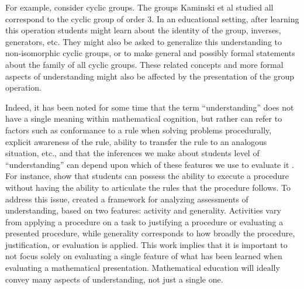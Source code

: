 \documentclass[man,10pt]{apa6}
\begin{document}
For example, consider cyclic groups. The groups Kaminski et al studied all correspond to the cyclic group of order 3. In an educational setting, after learning this operation students might learn about the identity of the group, inverses, generators, etc. They might also be asked to generalize this understanding to non-isomorphic cyclic groups, or to make general and possibly formal statements about the family of all cyclic groups. These related concepts and more formal aspects of understanding might also be affected by the presentation of the group operation. \par
Indeed, it has been noted for some time that the term ``understanding'' does not have a single meaning within mathematical cognition, but rather can refer to factors such as conformance to a rule when solving problems procedurally, explicit awareness of the rule, ability to transfer the rule to an analogous situation, etc., and that the inferences we make about students level of ``understanding'' can depend upon which of these features we use to evaluate it \cite{Bisanz1992}. For instance,  show that students can possess the ability to execute a procedure without having the ability to articulate the rules that the procedure follows. To address this issue,  created a framework for analyzing assessments of understanding, based on two features: activity and generality. Activities vary from applying a procedure on a task to justifying a procedure or evaluating a presented procedure, while generality corresponds to how broadly the procedure, justification, or evaluation is applied. This work implies that it is important to not focus solely on evaluating a single feature of what has been learned when evaluating a mathematical presentation. Mathematical education will ideally convey many aspects of understanding, not just a single one. \par
\end{document}
